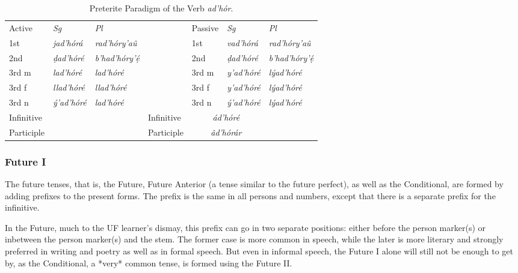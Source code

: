 \documentclass[a4paper, 12pt, oneside, final]{article}
\let \nf \normalfont
\begin{document}
\begin{table}[H]
\centering
\noindent\begin{tabular}{@{}|>{}l|>{\it}l|>{\it}l|>{}l|>{}l|>{\it}l|>{\it}l|}\cline{1-3}\cline{5-7}
\nf Active & \nf Sg   & \nf Pl     & \nf & \nf Passive & \nf Sg   & \nf Pl    \\\cline{1-3}\cline{5-7}
1st        & jad’hórá  & rad’hóry’aû     &     & 1st     & vad’hórá  & rad’hóry’aû   \\\cline{1-3}\cline{5-7}
2nd        & ḍad’hóré  & b’had’hóry’ẹ́  &     & 2nd      & ḍad’hóré  & b’had’hóry’ẹ́ \\\cline{1-3}\cline{5-7}
3rd m      & lad’hóré  & lad’hóré    &     & 3rd m      & y’ad’hóré & lýad’hóré  \\\cline{1-3}\cline{5-7}
3rd f      & llad’hóré & llad’hóré   &     & 3rd f      & y’ad’hóré & lýad’hóré  \\\cline{1-3}\cline{5-7}
3rd n      & ý’ad’hóré & lad’hóré   &     & 3rd n       & ý’ad’hóré & lýad’hóré  \\\cline{1-3}\cline{5-7}
Infinitive & \multicolumn{2}{c|}{\it dad’hóré} & & Infinitive & \multicolumn{2}{c|}{\it ád’hóré} \\\cline{1-3}\cline{5-7}
Participle&\multicolumn{2}{c|}{\it ad’hórâr}&&Participle&\multicolumn{2}{c|}{\it âd’hórár}\\\cline{1-3}\cline{5-7}
\end{tabular}
\caption{Preterite Paradigm of the Verb \emph{ad’hór}.}\label{tab:adhor-paradigm-pret}
\end{table}

\subsubsection{Future I}
The future tenses, that is, the Future, Future Anterior (a tense similar to the future perfect), as well
as the Conditional, are formed by adding prefixes to the present forms. The prefix is the same in all persons and numbers,
except that there is a separate prefix for the infinitive.

In the Future, much to the UF learner’s dismay, this prefix can go in two separate positions: either before the person marker(s) or
inbetween the person marker(s) and the stem. The former case is more common in speech, while the later is more literary
and strongly preferred in writing and poetry as well as in formal speech. But even in informal speech, the Future I alone
will still not be enough to get by, as the Conditional, a *very* common tense, is formed using the Future II.
\end{document}

